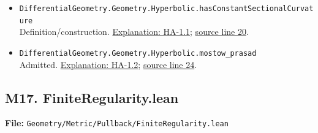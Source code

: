 \documentclass[
  letterpaper,
  11pt]{article}
\begin{document}
\begin{itemize}
\item
  {\small\texttt{Differential\allowbreak{}Geometry.\allowbreak{}Geometry.\allowbreak{}Hyperbolic.\allowbreak{}has\allowbreak{}Constant\allowbreak{}Sectional\allowbreak{}Curvature}}\\
  Definition/construction. \hyperref[ha-1-1]{Explanation: HA-1.1};
  \href{https://github.com/qinz1yang/differential-geometry-dev/blob/ea0fae60ee01ef8c8d9b57a51794c6538f679c5d/DifferentialGeometry/Geometry/Hyperbolic/Rigidity.lean\#L20}{source
  line 20}.
\item
  {\small\texttt{Differential\allowbreak{}Geometry.\allowbreak{}Geometry.\allowbreak{}Hyperbolic.\allowbreak{}mostow\_\allowbreak{}prasad}}\\
  Admitted. \hyperref[ha-1-2]{Explanation: HA-1.2};
  \href{https://github.com/qinz1yang/differential-geometry-dev/blob/ea0fae60ee01ef8c8d9b57a51794c6538f679c5d/DifferentialGeometry/Geometry/Hyperbolic/Rigidity.lean\#L24}{source
  line 24}.
\end{itemize}


\subsection{M17.
FiniteRegularity.lean}\label{m17.-finiteregularity.lean}

\textbf{File:}
{\small\texttt{Geometry/\allowbreak{}Metric/\allowbreak{}Pullback/\allowbreak{}Finite\allowbreak{}Regularity.\allowbreak{}lean}}
\end{document}
